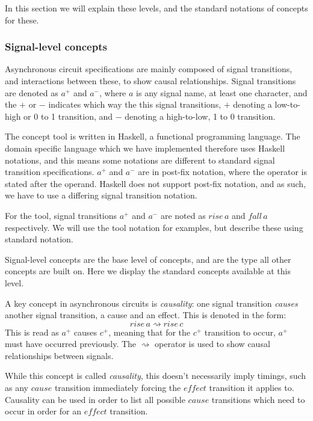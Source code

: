 \documentclass[british,conference,compsoc]{IEEEtran}
\begin{document}
In this section we will explain these levels, and the standard notations of concepts 
for these. 

\subsubsection{\label{signal-level}Signal-level concepts}Asynchronous circuit specifications
are mainly composed of signal transitions, and interactions between these, to show
causal relationships. Signal transitions are denoted as $a^{+}$ and $a^{-}$, where $a$ is
any signal name, at least one character, and the $+$ or $-$ indicates which way the 
this signal transitions, $+$ denoting a low-to-high or 0 to 1 transition, and $-$ denoting
a high-to-low, 1 to 0 transition. 

The concept tool is written in Haskell, a functional programming language. The domain
specific language which we have implemented therefore uses Haskell notations, and
this means some notations are different to standard signal transition specifications. 
$a^{+}$ and $a^{-}$ are in post-fix notation, where the operator is stated after the 
operand. Haskell does not support post-fix notation, and as such, we have to use
a differing signal transition notation. 

For the tool, signal transitions $a^{+}$ and $a^{-}$ are noted as $rise\,a$ and $fall\,a$
respectively. We will use the tool notation for examples, but describe these using
standard notation.

Signal-level concepts are the base level of concepts, and are 
the type all other concepts are built on. Here we display the standard concepts
available at this level.

A key concept in asynchronous circuits is \emph{causality}:
one signal transition \emph{causes} another signal transition, a cause and an effect.
This is denoted in the form: 
\[
rise\,a\rightsquigarrow rise\,c
\]
This is read as $a^{+}$ causes $c^{+}$, meaning that for the $c^{+}$ transition to
occur, $a^{+}$ must have occurred previously. The $\rightsquigarrow$ operator is
used to show causal relationships between signals.
 
While this concept is called \emph{causality}, this doesn't necessarily imply
timings, such as any $\mathit{cause}$ transition immediately forcing the
 $\mathit{effect}$ transition it applies to. Causality can be used in order to
list all possible $\mathit{cause}$ transitions which need to occur in order
 for an $\mathit{effect}$ transition.
\end{document}
